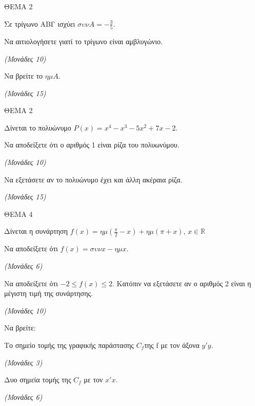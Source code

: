 \documentclass[11pt,a4paper,twoside]{book}
\newcommand{\monades}[1]{\hfill \textit{(Μονάδες #1)}}
\begin{document}
\vspace{4mm}

ΘΕΜΑ 2

Σε τρίγωνο ΑΒΓ ισχύει $\sigma\upsilon\nu A = -\frac{3}{5}$.

\begin{alist}
\item Να αιτιολογήσετε γιατί το τρίγωνο είναι αμβλυγώνιο.

\monades{10}

\item Να βρείτε το $\eta\mu A$.

\monades{15}
\end{alist}

\vspace{4mm}

ΘΕΜΑ 2

Δίνεται το πολυώνυμο $P(x) = x^4 - x^3 - 5x^2 + 7x - 2$.

\begin{alist}
\item Να αποδείξετε ότι ο αριθμός 1 είναι ρίζα του πολυωνύμου.

\monades{10}

\item Να εξετάσετε αν το πολυώνυμο έχει και άλλη ακέραια ρίζα.

\monades{15}
\end{alist}

\vspace{4mm}

ΘΕΜΑ 4

Δίνεται η συνάρτηση $f(x) = \eta\mu\left(\frac{\pi}{2} - x\right) + \eta\mu(\pi + x)$, $x \in \mathbb{R}$

\begin{alist}
\item Να αποδείξετε ότι $f(x) = \sigma\upsilon\nu x - \eta\mu x$.

\monades{6}

\item Να αποδείξετε ότι $-2 \le f(x) \le 2$. Κατόπιν να εξετάσετε αν ο αριθμός 2 είναι η μέγιστη τιμή της συνάρτησης.

\monades{10}

\item Να βρείτε:

\end{alist}
\begin{alist}
\item
  Το σημείο τομής της γραφικής παράστασης $C_f$της f με τον άξονα $y'y$.

\monades{3}


\end{alist}
\begin{alist}
\item
  Δυο σημεία τομής της $C_f$ με τον $x'x$.

\monades{6}
\end{alist}
\end{document}
